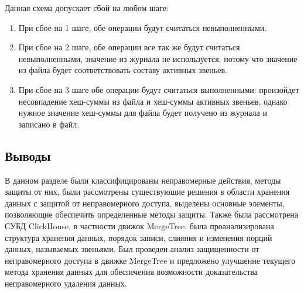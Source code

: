 Данная схема допускает сбой на любом шаге:
\begin{enumerate}
	\item При сбое на 1 шаге, обе операции будут считаться невыполненными.
	\item При сбое на 2 шаге, обе операции все так же будут считаться невыполненными, значение из журнала не используется, потому что значение из файла будет соответствовать составу активных звеньев.
	\item При сбое на 3 шаге обе операции будут считаться выполненными: произойдет несовпадение хеш-суммы из файла и хеш-суммы активных звеньев, однако нужное значение хеш-суммы для файла будет получено из журнала и записано в файл.
\end{enumerate}

\subsection{Выводы}

В данном разделе были классифицированы неправомерные действия, методы защиты от них, были рассмотрены существующие решения в области хранения данных с защитой от неправомерного доступа, выделены основные элементы, позволяющие обеспечить определенные методы защиты. Также была рассмотрена СУБД ClickHouse, в частности движок MergeTree: была проанализирована структура хранения данных, порядок записи, слияния и изменения порций данных, называемых звеньями. Был проведен анализ защищенности от неправомерного доступа в движке MergeTree и предложено улучшение текущего метода хранения данных для обеспечения возможности доказательства неправомерного удаления данных.

\pagebreak
